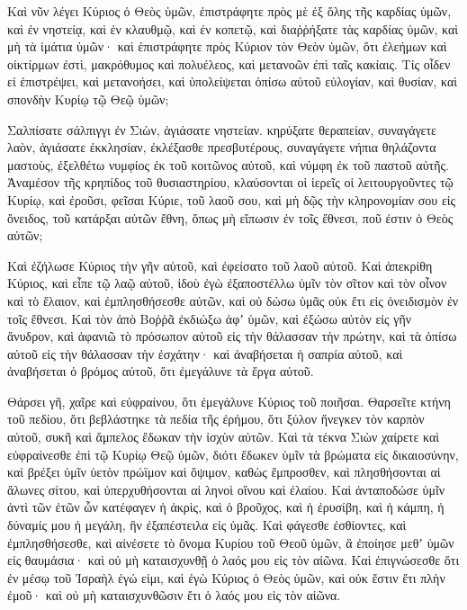 \begin{spacing}{1.1}
\begin{multicols}{2}
Καὶ νῦν λέγει Κύριος ὁ Θεὸς ὑμῶν, ἐπιστράφητε πρὸς μὲ ἐξ ὅλης τῆς καρδίας ὑμῶν, καὶ ἐν νηστείᾳ, καὶ ἐν κλαυθμῷ, καὶ ἐν κοπετῷ,
καὶ διαῤῥήξατε τὰς καρδίας ὑμῶν, καὶ μὴ τὰ ἱμάτια ὑμῶν· καὶ ἐπιστράφητε πρὸς Κύριον τὸν Θεὸν ὑμῶν, ὅτι ἐλεήμων καὶ οἰκτίρμων ἐστὶ, μακρόθυμος καὶ πολυέλεος, καὶ μετανοῶν ἐπὶ ταῖς κακίαις.
Τίς οἶδεν εἰ ἐπιστρέψει, καὶ μετανοήσει, καὶ ὑπολείψεται ὀπίσω αὐτοῦ εὐλογίαν, καὶ θυσίαν, καὶ σπονδὴν Κυρίῳ τῷ Θεῷ ὑμῶν;

Σαλπίσατε σάλπιγγι ἐν Σιὼν, ἁγιάσατε νηστείαν. κηρύξατε θεραπείαν,
συναγάγετε λαὸν, ἁγιάσατε ἐκκλησίαν, ἐκλέξασθε πρεσβυτέρους, συναγάγετε νήπια θηλάζοντα μαστοὺς, ἐξελθέτω νυμφίος ἐκ τοῦ κοιτῶνος αὐτοῦ, καὶ νύμφη ἐκ τοῦ παστοῦ αὐτῆς.
Ἀναμέσον τῆς κρηπίδος τοῦ θυσιαστηρίου, κλαύσονται οἱ ἱερεῖς οἱ λειτουργοῦντες τῷ Κυρίῳ, καὶ ἐροῦσι, φεῖσαι Κύριε, τοῦ λαοῦ σου, καὶ μὴ δῷς τὴν κληρονομίαν σου εἰς ὄνειδος, τοῦ κατάρξαι αὐτῶν ἔθνη, ὅπως μὴ εἴπωσιν ἐν τοῖς ἔθνεσι, ποῦ ἐστιν ὁ Θεὸς αὐτῶν;

Καὶ ἐζήλωσε Κύριος τὴν γῆν αὐτοῦ, καὶ ἐφείσατο τοῦ λαοῦ αὐτοῦ.
Καὶ ἀπεκρίθη Κύριος, καὶ εἶπε τῷ λαῷ αὐτοῦ, ἰδοὺ ἐγὼ ἐξαποστέλλω ὑμῖν τὸν σῖτον καὶ τὸν οἶνον καὶ τὸ ἔλαιον, καὶ ἐμπλησθήσεσθε αὐτῶν, καὶ οὐ δώσω ὑμᾶς οὐκ ἔτι εἰς ὀνειδισμὸν ἐν τοῖς ἔθνεσι.
Καὶ τὸν ἀπὸ Βοῤῥᾶ ἐκδιώξω ἀφʼ ὑμῶν, καὶ ἐξώσω αὐτὸν εἰς γῆν ἄνυδρον, καὶ ἀφανιῶ τὸ πρόσωπον αὐτοῦ εἰς τὴν θάλασσαν τὴν πρώτην, καὶ τὰ ὀπίσω αὐτοῦ εἰς τὴν θάλασσαν τὴν ἐσχάτην· καὶ ἀναβήσεται ἡ σαπρία αὐτοῦ, καὶ ἀναβήσεται ὁ βρόμος αὐτοῦ, ὅτι ἐμεγάλυνε τὰ ἔργα αὐτοῦ.

Θάρσει γῆ, χαῖρε καὶ εὐφραίνου, ὅτι ἐμεγάλυνε Κύριος τοῦ ποιῆσαι.
Θαρσεῖτε κτήνη τοῦ πεδίου, ὅτι βεβλάστηκε τὰ πεδία τῆς ἐρήμου, ὅτι ξύλον ἤνεγκεν τὸν καρπὸν αὐτοῦ, συκῆ καὶ ἄμπελος ἔδωκαν τὴν ἰσχὺν αὐτῶν.
Καὶ τὰ τέκνα Σιὼν χαίρετε καὶ εὐφραίνεσθε ἐπὶ τῷ Κυρίῳ Θεῷ ὑμῶν, διότι ἔδωκεν ὑμῖν τὰ βρώματα εἰς δικαιοσύνην, καὶ βρέξει ὑμῖν ὑετὸν πρώϊμον καὶ ὄψιμον, καθὼς ἔμπροσθεν,
καὶ πλησθήσονται αἱ ἅλωνες σίτου, καὶ ὑπερχυθήσονται αἱ ληνοὶ οἴνου καὶ ἐλαίου.
Καὶ ἀνταποδώσε ὑμῖν ἀντὶ τῶν ἐτῶν ὧν κατέφαγεν ἡ ἀκρὶς, καὶ ὁ βροῦχος, καὶ ἡ ἐρυσίβη, καὶ ἡ κάμπη, ἡ δύναμίς μου ἡ μεγάλη, ἣν ἐξαπέστειλα εἰς ὑμᾶς.
Καὶ φάγεσθε ἐσθίοντες, καὶ ἐμπλησθήσεσθε, καὶ αἰνέσετε τὸ ὄνομα Κυρίου τοῦ Θεοῦ ὑμῶν, ἃ ἐποίησε μεθʼ ὑμῶν εἰς θαυμάσια· καὶ οὐ μὴ καταισχυνθῇ ὁ λαός μου εἰς τὸν αἰῶνα.
Καὶ ἐπιγνώσεσθε ὅτι ἐν μέσῳ τοῦ Ἰσραὴλ ἐγώ εἰμι, καὶ ἐγὼ Κύριος ὁ Θεὸς ὑμῶν, καὶ οὐκ ἕστιν ἔτι πλὴν ἐμοῦ· καὶ οὐ μὴ καταισχυνθῶσιν ἔτι ὁ λαός μου εἰς τὸν αἰῶνα.


\end{multicols}
\end{spacing}
